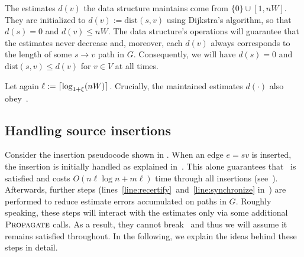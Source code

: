 \documentclass[11pt,letterpaper]{article}
\theoremstyle{plain}
\newcommand{\dist}{\mathrm{dist}}
\DeclareMathOperator*{\PD}{\textsc{Propagate}}
\begin{document}
The estimates $d(v)$ the data structure maintains come from $\{0\}\cup [1,nW]$. 
They are initialized to $d(v):=\dist(s,v)$ using Dijkstra's algorithm, so that $d(s)=0$ and $d(v)\leq nW$.
The data structure's operations will guarantee that the estimates never decrease and, moreover,
each $d(v)$ always corresponds to the length of some $s\to v$ path in $G$.
Consequently, we will have $d(s)=0$ and $\dist(s,v)\leq d(v)$ for $v\in V$ at all times.

Let again ${\ell:=\lceil \log_{1+\xi}(nW)\rceil}$. 
Crucially, the maintained estimates $d(\cdot)$ also obey~.
\subsection{Handling source insertions}

Consider the insertion pseudocode shown in .
When an edge $e=sv$ is inserted, the insertion is initially handled as explained
in~.
This alone guarantees that~ is satisfied and costs $O(n\ell\log{n}+m\ell)$ time through all insertions (see~).
Afterwards, further steps (lines~\ref{line:recertify}~and~\ref{line:synchronize} in~) are performed to reduce estimate errors accumulated on paths in $G$.
Roughly speaking, these steps will interact with the estimates only via some additional $\PD$ calls. 
As a result, they cannot break~ and thus we will assume it remains satisfied throughout.
In the following, we explain the ideas behind these steps in detail.
\end{document}
